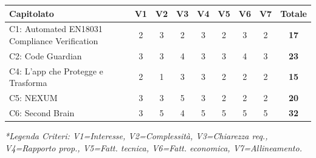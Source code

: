 \vspace{0.5cm}
\begin{table}[ht]
	\centering
	\renewcommand{\arraystretch}{1.3}
\begin{tabularx}{\textwidth}{>{\raggedright\arraybackslash}X c c c c c c c | c}
		\toprule
		\textbf{Capitolato} & \textbf{V1} & \textbf{V2} & \textbf{V3} & \textbf{V4} & \textbf{V5} & \textbf{V6} & \textbf{V7} & \textbf{Totale} \\
		\midrule
		C1: {Automated EN18031 Compliance Verification} & 2 & 3 & 2 & 3 & 2 & 3 & 2 & \textbf{17} \\
        C2: {Code Guardian} & 3 & 3 & 4 & 3 & 3 & 4 & 3 & \textbf{23} \\
        C4: {L'app che Protegge e Trasforma} & 2 & 1 & 3 & 3 & 2 & 2 & 2 & \textbf{15} \\
		C5: {NEXUM} & 3 & 3 & 5 & 3 & 2 & 2 & 2 & \textbf{20} \\
		C6: {Second Brain} & 3 & 5 & 4 & 5 & 5 & 5 & 5 & \textbf{32} \\
		\bottomrule
	\end{tabularx}
\end{table}
\vspace{0.2cm}
\textit{*Legenda Criteri: V1=Interesse, V2=Complessità, V3=Chiarezza req., V4=Rapporto prop., V5=Fatt. tecnica, V6=Fatt. economica, V7=Allineamento.}

\vspace{1cm}